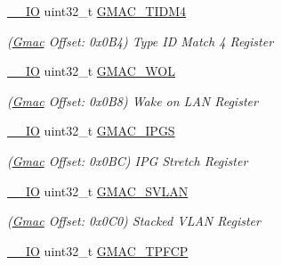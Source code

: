 \begin{DoxyCompactItemize}
\mbox{\hyperlink{core__cm7_8h_aec43007d9998a0a0e01faede4133d6be}{\+\_\+\+\_\+\+IO}} uint32\+\_\+t \mbox{\hyperlink{structGmac_adfc81acad15f98aeaa2b6210e99d0117}{G\+M\+A\+C\+\_\+\+T\+I\+D\+M4}}
\begin{DoxyCompactList}\small\item\em (\mbox{\hyperlink{structGmac}{Gmac}} Offset\+: 0x0\+B4) Type ID Match 4 Register \end{DoxyCompactList}\item 
\mbox{\label{structGmac_a5365fc50bed6dde92816efbaa950743b}} 
\mbox{\hyperlink{core__cm7_8h_aec43007d9998a0a0e01faede4133d6be}{\+\_\+\+\_\+\+IO}} uint32\+\_\+t \mbox{\hyperlink{structGmac_a5365fc50bed6dde92816efbaa950743b}{G\+M\+A\+C\+\_\+\+W\+OL}}
\begin{DoxyCompactList}\small\item\em (\mbox{\hyperlink{structGmac}{Gmac}} Offset\+: 0x0\+B8) Wake on L\+AN Register \end{DoxyCompactList}\item 
\mbox{\label{structGmac_a2d4416becbe640653a37e2d031f082ac}} 
\mbox{\hyperlink{core__cm7_8h_aec43007d9998a0a0e01faede4133d6be}{\+\_\+\+\_\+\+IO}} uint32\+\_\+t \mbox{\hyperlink{structGmac_a2d4416becbe640653a37e2d031f082ac}{G\+M\+A\+C\+\_\+\+I\+P\+GS}}
\begin{DoxyCompactList}\small\item\em (\mbox{\hyperlink{structGmac}{Gmac}} Offset\+: 0x0\+BC) I\+PG Stretch Register \end{DoxyCompactList}\item 
\mbox{\label{structGmac_a8397b05a29cb554e3b000dd49e0df489}} 
\mbox{\hyperlink{core__cm7_8h_aec43007d9998a0a0e01faede4133d6be}{\+\_\+\+\_\+\+IO}} uint32\+\_\+t \mbox{\hyperlink{structGmac_a8397b05a29cb554e3b000dd49e0df489}{G\+M\+A\+C\+\_\+\+S\+V\+L\+AN}}
\begin{DoxyCompactList}\small\item\em (\mbox{\hyperlink{structGmac}{Gmac}} Offset\+: 0x0\+C0) Stacked V\+L\+AN Register \end{DoxyCompactList}\item 
\mbox{\label{structGmac_ab9478d196dc6d03de2a2861eda6f1358}} 
\mbox{\hyperlink{core__cm7_8h_aec43007d9998a0a0e01faede4133d6be}{\+\_\+\+\_\+\+IO}} uint32\+\_\+t \mbox{\hyperlink{structGmac_ab9478d196dc6d03de2a2861eda6f1358}{G\+M\+A\+C\+\_\+\+T\+P\+F\+CP}}

\end{DoxyCompactItemize}
